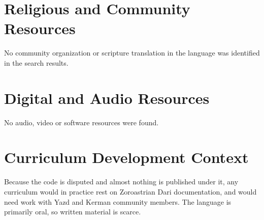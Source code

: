\documentclass[12pt]{article}
\begin{document}
\section{Religious and Community Resources}
No community organization or scripture translation in the language was identified in the search results.

\section{Digital and Audio Resources}
No audio, video or software resources were found.

\section{Curriculum Development Context}
Because the code is disputed and almost nothing is published under it, any curriculum would in practice rest on Zoroastrian Dari documentation, and would need work with Yazd and Kerman community members. The language is primarily oral, so written material is scarce.
\end{document}
